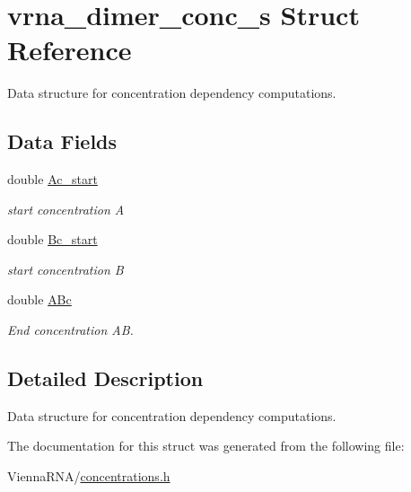 \hypertarget{structvrna__dimer__conc__s}{}\section{vrna\+\_\+dimer\+\_\+conc\+\_\+s Struct Reference}
\label{structvrna__dimer__conc__s}


Data structure for concentration dependency computations.  


\subsection*{Data Fields}
\begin{DoxyCompactItemize}
\item 
\mbox{\label{structvrna__dimer__conc__s_a6e64ce1afbc93756afef06c0e3ccce97}} 
double \hyperlink{structvrna__dimer__conc__s_a6e64ce1afbc93756afef06c0e3ccce97}{Ac\+\_\+start}
\begin{DoxyCompactList}\small\item\em start concentration A \end{DoxyCompactList}\item 
\mbox{\label{structvrna__dimer__conc__s_a5763381efee22a0bbec2f2d0754f7697}} 
double \hyperlink{structvrna__dimer__conc__s_a5763381efee22a0bbec2f2d0754f7697}{Bc\+\_\+start}
\begin{DoxyCompactList}\small\item\em start concentration B \end{DoxyCompactList}\item 
\mbox{\label{structvrna__dimer__conc__s_aef56a1fe8d7f07e7b5d9a65417dda8a4}} 
double \hyperlink{structvrna__dimer__conc__s_aef56a1fe8d7f07e7b5d9a65417dda8a4}{A\+Bc}
\begin{DoxyCompactList}\small\item\em End concentration AB. \end{DoxyCompactList}\end{DoxyCompactItemize}


\subsection{Detailed Description}
Data structure for concentration dependency computations. 

The documentation for this struct was generated from the following file\+:\begin{DoxyCompactItemize}
\item 
Vienna\+R\+N\+A/\hyperlink{concentrations_8h}{concentrations.\+h}\end{DoxyCompactItemize}
